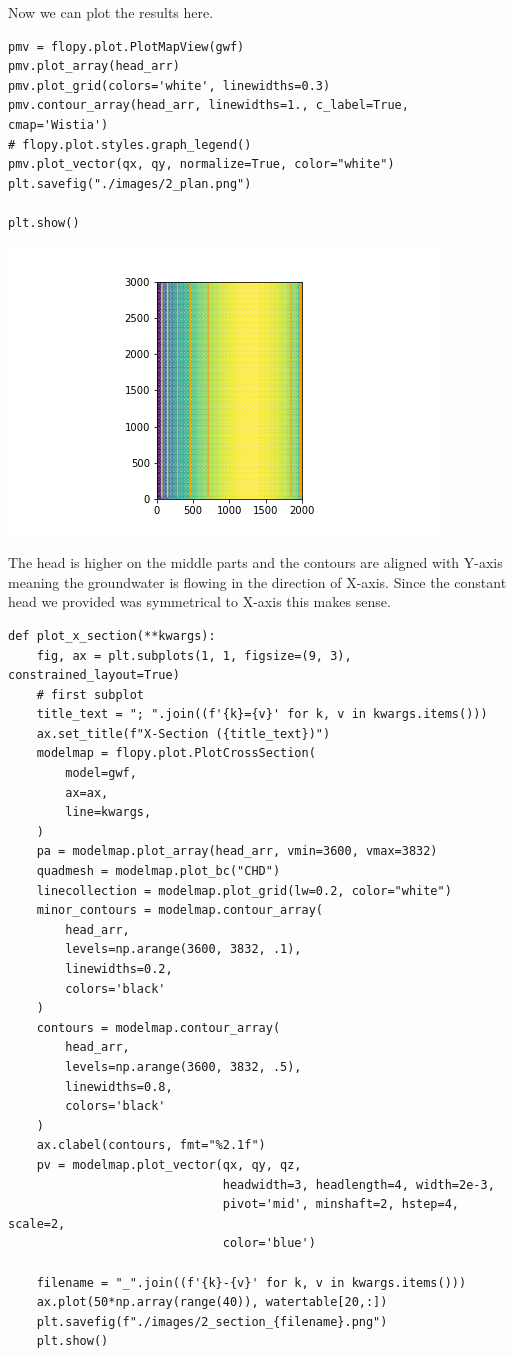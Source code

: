 \documentclass[titlepage,12pt]{unisubmission}
\begin{document}
Now we can plot the results here.

\begin{verbatim}
pmv = flopy.plot.PlotMapView(gwf)
pmv.plot_array(head_arr)
pmv.plot_grid(colors='white', linewidths=0.3)
pmv.contour_array(head_arr, linewidths=1., c_label=True, cmap='Wistia')
# flopy.plot.styles.graph_legend()
pmv.plot_vector(qx, qy, normalize=True, color="white")
plt.savefig("./images/2_plan.png")

plt.show()
\end{verbatim}

\begin{center}
\includegraphics[width=.9\linewidth]{./images/2_plan.png}
\end{center}

The head is higher on the middle parts and the contours are aligned with Y-axis meaning the groundwater is flowing in the direction of X-axis. Since the constant head we provided was symmetrical to X-axis this makes sense.

\begin{verbatim}
def plot_x_section(**kwargs):
    fig, ax = plt.subplots(1, 1, figsize=(9, 3), constrained_layout=True)
    # first subplot
    title_text = "; ".join((f'{k}={v}' for k, v in kwargs.items()))
    ax.set_title(f"X-Section ({title_text})")
    modelmap = flopy.plot.PlotCrossSection(
        model=gwf,
        ax=ax,
        line=kwargs,
    )
    pa = modelmap.plot_array(head_arr, vmin=3600, vmax=3832)
    quadmesh = modelmap.plot_bc("CHD")
    linecollection = modelmap.plot_grid(lw=0.2, color="white")
    minor_contours = modelmap.contour_array(
        head_arr,
        levels=np.arange(3600, 3832, .1),
        linewidths=0.2,
        colors='black'
    )
    contours = modelmap.contour_array(
        head_arr,
        levels=np.arange(3600, 3832, .5),
        linewidths=0.8,
        colors='black'
    )
    ax.clabel(contours, fmt="%2.1f")
    pv = modelmap.plot_vector(qx, qy, qz,
                              headwidth=3, headlength=4, width=2e-3,
                              pivot='mid', minshaft=2, hstep=4, scale=2,
                              color='blue')

    filename = "_".join((f'{k}-{v}' for k, v in kwargs.items()))
    ax.plot(50*np.array(range(40)), watertable[20,:])
    plt.savefig(f"./images/2_section_{filename}.png")
    plt.show()
\end{verbatim}
\end{document}
